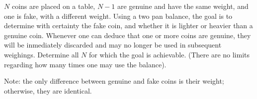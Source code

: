 $N$ coins are placed on a table, $N - 1$ are genuine and have the same weight, and one is fake, with a different weight. Using a two pan balance, the goal is to determine with certainty the fake coin, and whether it is lighter or heavier than a genuine coin. Whenever one can deduce that one or more coins are genuine, they will be inmediately discarded and may no longer be used in subsequent weighings. Determine all $N$ for which the goal is achievable. (There are no limits regarding how many times one may use the balance).

Note: the only difference between genuine and fake coins is their weight; otherwise, they are identical.